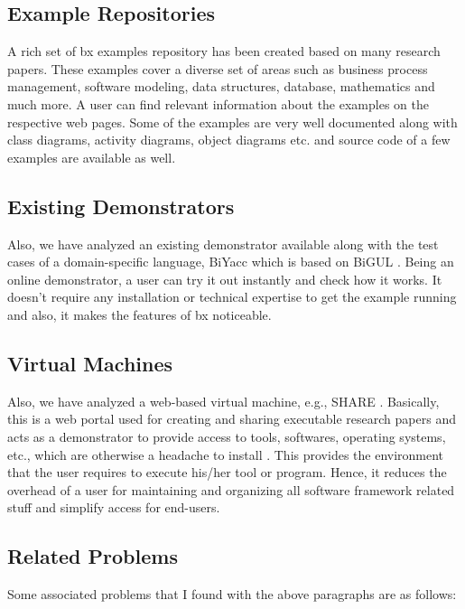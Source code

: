 \subsection{Example Repositories}\label{subsec:examplerep}
A rich set of bx examples repository \cite{bx-examples} has been created based on many research papers. These examples cover a diverse set of areas such as business process management, software modeling, data structures, database, mathematics and much more.
\newline\newline A user can find relevant information about the examples on the respective web pages. Some of the examples are very well documented along with class diagrams, activity diagrams, object diagrams etc. and source code of a few examples are available as well.

\subsection{Existing Demonstrators}\label{subsec:existingdemo}
Also, we have analyzed an existing demonstrator available along with the test cases of a domain-specific language, BiYacc \cite{biyacc} which is based on BiGUL \cite{bigul}. 
\newline\newline Being an online demonstrator, a user can try it out instantly and check how it works. It doesn't require any installation or technical expertise to get the example running and also, it makes the features of bx noticeable.
 
\subsection{Virtual Machines}\label{subsec:virtualmachines}
Also, we have analyzed a web-based virtual machine, e.g., SHARE \cite{share}. Basically, this is a web portal used for creating and sharing executable research papers and acts as a demonstrator to provide access to tools, softwares, operating systems, etc., which are otherwise a headache to install \cite{share}. 
\newline\newline This provides the environment that the user requires to execute his/her tool or program. Hence, it reduces the overhead of a user for maintaining and organizing all software framework related stuff and simplify access for end-users.
	
\subsection{Related Problems}\label{subsec:problem}
Some associated problems that I found with the above paragraphs are as follows: 

